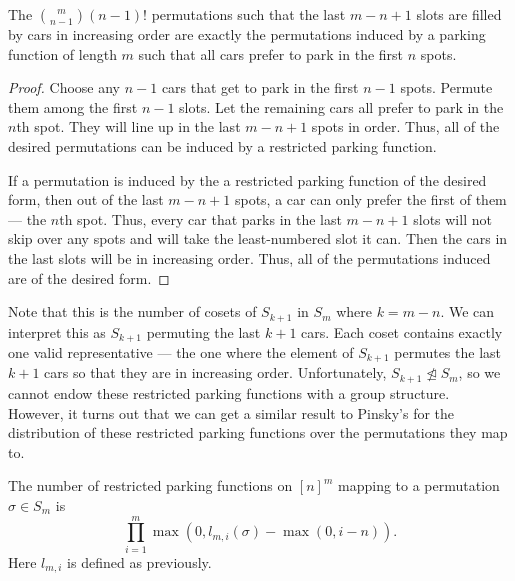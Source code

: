 \begin{proposition}
    The $\binom{m}{n - 1}(n - 1)!$ permutations such that the last $m - n + 1$ slots are filled by cars in increasing order are exactly the permutations induced by a parking function of length $m$ such that all cars prefer to park in the first $n$ spots.
\end{proposition}

\begin{proof}
    Choose any $n - 1$ cars that get to park in the first $n - 1$ spots. Permute them among the first $n - 1$ slots. Let the remaining cars all prefer to park in the $n$th spot. They will line up in the last $m - n + 1$ spots in order. Thus, all of the desired permutations can be induced by a restricted parking function.

    If a permutation is induced by the a restricted parking function of the desired form, then out of the last $m - n + 1$ spots, a car can only prefer the first of them --- the $n$th spot. Thus, every car that parks in the last $m - n + 1$ slots will not skip over any spots and will take the least-numbered slot it can. Then the cars in the last slots will be in increasing order. Thus, all of the permutations induced are of the desired form.
\end{proof}

Note that this is the number of cosets of $S_{k + 1}$ in $S_m$ where $k = m - n$. We can interpret this as $S_{k + 1}$ permuting the last $k + 1$ cars. Each coset contains exactly one valid representative --- the one where the element of $S_{k + 1}$ permutes the last $k + 1$ cars so that they are in increasing order. Unfortunately, $S_{k + 1} \not \trianglelefteq S_m$, so we cannot endow these restricted parking functions with a group structure. \\

However, it turns out that we can get a similar result to Pinsky's \cite{pinsky2024distribution} for the distribution of these restricted parking functions over the permutations they map to.

\begin{proposition}
    The number of restricted parking functions on $[n]^m$ mapping to a permutation $\sigma\in S_m$ is
    \[
    \prod_{i=1}^m \max(0,l_{m,i}(\sigma)-\max(0,i-n)).
    \]
    Here $l_{m, i}$ is defined as previously.
\end{proposition}


